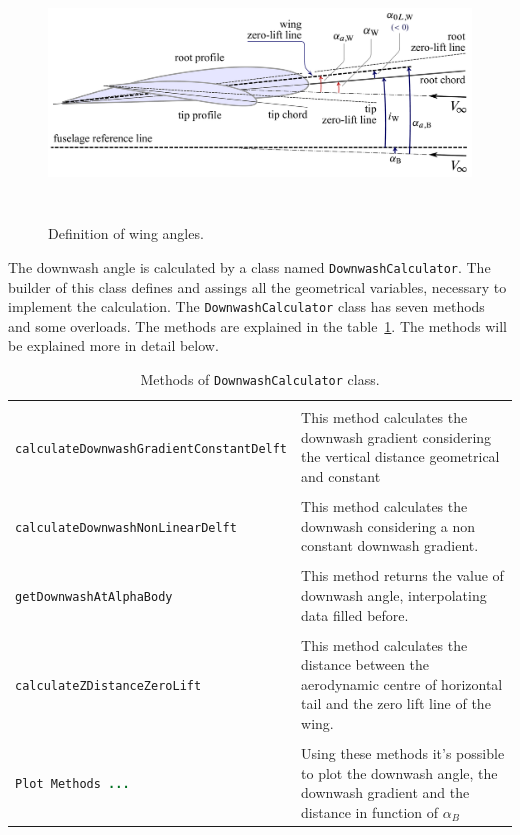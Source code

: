 \begin{figure}[H]
\centering
{\includegraphics[height=6cm]{Immagini/Wing_Alpha_Zero_List.pdf}} 
\caption{Definition of wing angles.}
\label{angles}
\end{figure} 


The downwash angle is calculated by a class named \texttt{DownwashCalculator}. The builder of this class defines and assings all the geometrical variables, necessary to implement the calculation. The  \texttt{DownwashCalculator} class has seven methods and some overloads. The methods are explained in the table~\ref{table:Table1}. The methods will be explained more in detail below.

\begin{table}[H]
\begin{tabular}{p{7cm}p{7.5cm}}
\toprule
 \\[0.1	cm] 
\lstinline[language=Java]!calculateDownwashGradientConstantDelft! & This method calculates the downwash gradient  considering the vertical distance geometrical and constant\\ \hline \\[0.1	cm] 
\lstinline[language=Java]!calculateDownwashNonLinearDelft! &This method calculates the downwash considering a non constant downwash gradient.  \\ \hline \\ [0.1cm]
\lstinline[language=Java]!getDownwashAtAlphaBody! & This method returns the value of downwash angle, interpolating data filled before.\\ \hline \\[0.1cm]
\lstinline[language=Java]!calculateZDistanceZeroLift!	& This method calculates the distance between the aerodynamic centre of horizontal tail and the zero lift line of the wing. \\ \hline \\[0.1cm]
\lstinline[language=Java]!Plot Methods ...! & Using these methods it's possible to plot the downwash angle, the downwash gradient and the distance in function of $\alpha_{B}$ \\
\bottomrule
\end{tabular}
\caption{Methods of \texttt{DownwashCalculator} class.}
\label{table:Table1}
\end{table}

